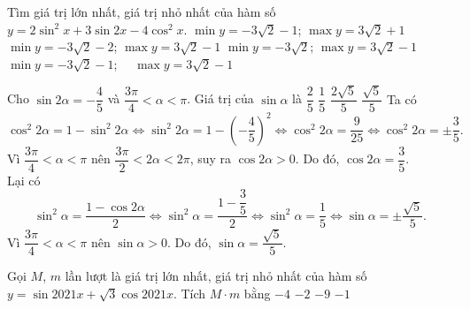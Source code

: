 \begin{ex}%
Tìm giá trị lớn nhất, giá trị nhỏ nhất của hàm số $y=2 \sin ^2 x+3 \sin 2 x-4 \cos ^2 x$.
\choice
{$\min y=-3 \sqrt{2}-1$; $\max y=3 \sqrt{2}+1$}
{$\min y=-3 \sqrt{2}-2$; $\max y=3 \sqrt{2}-1$}
{$\min y=-3 \sqrt{2}$; $\max y=3 \sqrt{2}-1$}
{\True $\min y=-3 \sqrt{2}-1 $; $ \quad \max y=3 \sqrt{2}-1$}
\end{ex}

\begin{ex}%
Cho $\sin 2\alpha=-\dfrac{4}{5}$ và $\dfrac{3\pi}{4}<\alpha<\pi$. Giá trị của $\sin \alpha$ là
\choice
{$\dfrac{2}{5}$}
{$\dfrac{1}{5}$}
{$\dfrac{2\sqrt{5}}{5}$}
{\True $\dfrac{\sqrt{5}}{5}$}
\loigiai
{
Ta có
\[\cos^2 2\alpha = 1-\sin^2 2\alpha \Leftrightarrow \sin^2 2\alpha = 1-\left(-\dfrac{4}{5}\right)^2 \Leftrightarrow \cos^2 2\alpha = \dfrac{9}{25} \Leftrightarrow \cos^2 2\alpha = \pm\dfrac{3}{5}.\]
Vì $\dfrac{3\pi}{4}<\alpha<\pi$ nên $\dfrac{3\pi}{2}<2\alpha<2\pi$, suy ra $\cos 2\alpha>0$. Do đó, $\cos 2\alpha = \dfrac{3}{5}$.\\
Lại có
\[\sin^2 \alpha = \dfrac{1-\cos 2\alpha}{2} \Leftrightarrow \sin^2 \alpha = \dfrac{1-\dfrac{3}{5}}{2} \Leftrightarrow \sin^2 \alpha=\dfrac{1}{5} \Leftrightarrow \sin \alpha=\pm\dfrac{\sqrt{5}}{5}.\]
Vì $\dfrac{3\pi}{4}<\alpha<\pi$ nên $\sin\alpha>0$. Do đó, $\sin\alpha=\dfrac{\sqrt{5}}{5}$.
}
\end{ex}

\begin{ex}%
Gọi $M$, $m$ lần lượt là giá trị lớn nhất, giá trị nhỏ nhất của hàm số $y=\sin 2021 x+\sqrt{3} \cos 2021 x$. Tích $M\cdot m$ bằng
\choice
{\True $-4$}
{$-2$}
{$-9$}
{$-1$}
\end{ex}


